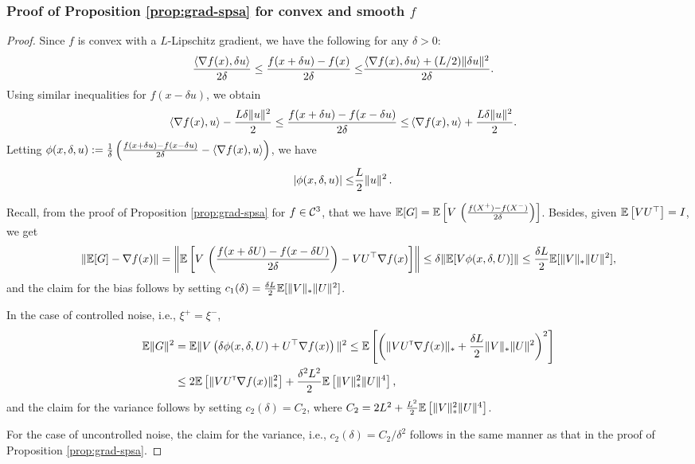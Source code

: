 \subsubsection*{Proof of Proposition \ref{prop:grad-spsa} for convex and smooth $f$}
\begin{proof}
Since $f$ is convex with a  $L$-Lipschitz gradient, we have the following for any $\delta>0$:
\begin{align*}
\frac{\left\langle\nabla f(x), \delta u\right\rangle}{2\delta} \le \frac{f(x + \delta u) -  f(x)}{2\delta} \le& \frac{\left\langle\nabla f(x), \delta u\right\rangle + (L / 2) \|\delta u\|^2}{2\delta}.
\end{align*}
Using similar inequalities for $f(x-\delta u)$, we obtain
\begin{align*}
\left\langle\nabla f(x), u\right\rangle - \frac{L \delta \| u\|^2}{2} \le \frac{f(x + \delta u) -  f(x-\delta u)}{2\delta} \le& \left\langle\nabla f(x), u\right\rangle + \frac{L \delta \| u\|^2}{2}.
\end{align*}
Letting 
$\phi(x,\delta,u):=\frac1{\delta}\left(\frac{f(x + \delta u) -  f(x-\delta u)}{2\delta} - \left\langle\nabla f(x),  u\right\rangle\right)$, we have
\begin{align*}
\left|\phi(x,\delta,u) \right| \le&  \dfrac{L}{2} \|u\|^2\,.
\end{align*}

Recall, from the proof of Proposition \ref{prop:grad-spsa} for $f\in \mathcal{C}^3$, that 
we have
$\mathbb{E}[G] =  \mathbb{E}\left[V\,  \left(\tfrac{f(X^+)  -f(X^-)}{2\delta}\right) \right]$. Besides, given $\mathbb{E}\left[V U^\top\right]=I$,  we get
\begin{align*}
 \|\mathbb{E}[G] - \nabla f(x)\| 
 = \left\|\mathbb{E}\left[V\,  \left(\frac{f(x+\delta U)  -f(x-\delta U)}{2\delta}\right)-V U^\top\nabla f(x) \right]\right\|
 \le \delta \|\mathbb{E}[ V \phi(x,\delta, U)]\|
 \le \frac{\delta L}{2} \mathbb{E}[ \|V\|_* \|U\|^2],
\end{align*}
and the claim for the bias follows by setting $c_1(\delta)= \frac{\delta L}{2} \mathbb{E}[ \|V\|_* \|U\|^2]$.

In the case of controlled noise, i.e., $\xi^+ = \xi^-$, 
\begin{align*}
 \mathbb{E} \|G\|^2 
& = \mathbb{E}\|V\left(\delta \phi(x,\delta, U)+ U^\top\nabla f(x) \right)\|^2
 \le  \mathbb{E}\left[ \left( \| V U ^\mathsf{\scriptscriptstyle T} \nabla f(x)\|_* + \frac{\delta L}{2} \|V\|_* \|U\|^2 \right)^2\right]\\
& \le  2 \mathbb{E}\left[  \| V U ^\mathsf{\scriptscriptstyle T} \nabla f(x)\|_*^2\right]  + \frac{\delta^2 L^2}{2}\mathbb{E}\left[ \|V\|_*^2 \|U\|^4 \right],
\end{align*}
and the claim for the variance follows by setting $c_2(\delta) = C_2$, 
where $C_2 =  2 L^2  + \frac{ L^2}{2}\mathbb{E}\left[ \|V\|_*^2 \|U\|^4 \right]$.

For the case of uncontrolled noise, the claim for the variance, i.e., $c_2(\delta) = C_2/\delta^2$ follows in the same manner as that in the proof of Proposition \ref{prop:grad-spsa}.
\end{proof}


